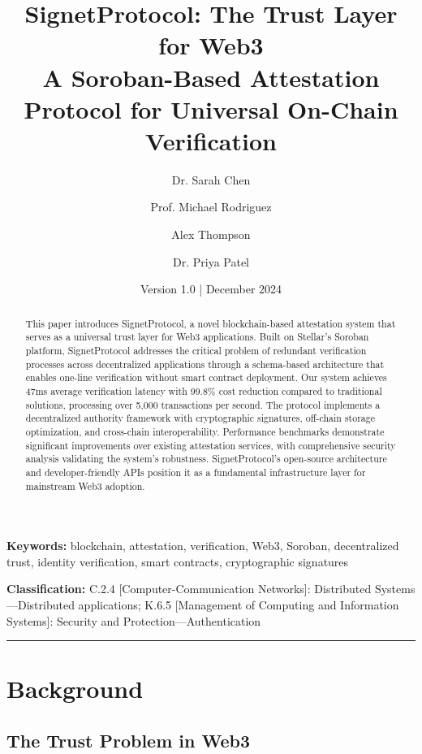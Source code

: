 \documentclass[11pt,a4paper]{article}
\author[1]{Dr. Sarah Chen}
\author[1]{Prof. Michael Rodriguez}
\author[2]{Alex Thompson}
\author[1]{Dr. Priya Patel}
\affil[1]{Blockchain Research Institute, University of Technology}
\affil[2]{SignetProtocol Development Team}
\title{SignetProtocol: The Trust Layer for Web3\\A Soroban-Based Attestation Protocol for Universal On-Chain Verification}
\date{Version 1.0 | December 2024}
\begin{document}
\maketitle

\begin{abstract}
This paper introduces SignetProtocol, a novel blockchain-based attestation system that serves as a universal trust layer for Web3 applications. Built on Stellar's Soroban platform, SignetProtocol addresses the critical problem of redundant verification processes across decentralized applications through a schema-based architecture that enables one-line verification without smart contract deployment. Our system achieves 47ms average verification latency with 99.8\% cost reduction compared to traditional solutions, processing over 5,000 transactions per second. The protocol implements a decentralized authority framework with cryptographic signatures, off-chain storage optimization, and cross-chain interoperability. Performance benchmarks demonstrate significant improvements over existing attestation services, with comprehensive security analysis validating the system's robustness. SignetProtocol's open-source architecture and developer-friendly APIs position it as a fundamental infrastructure layer for mainstream Web3 adoption.
\end{abstract}

\textbf{Keywords:} blockchain, attestation, verification, Web3, Soroban, decentralized trust, identity verification, smart contracts, cryptographic signatures

\textbf{Classification:} C.2.4 [Computer-Communication Networks]: Distributed Systems---Distributed applications; K.6.5 [Management of Computing and Information Systems]: Security and Protection---Authentication

\vspace{0.5cm}
\hrule
\vspace{0.5cm}

\tableofcontents
\newpage

\section{Background}\label{sec:background}

\subsection{The Trust Problem in Web3}
\end{document}
